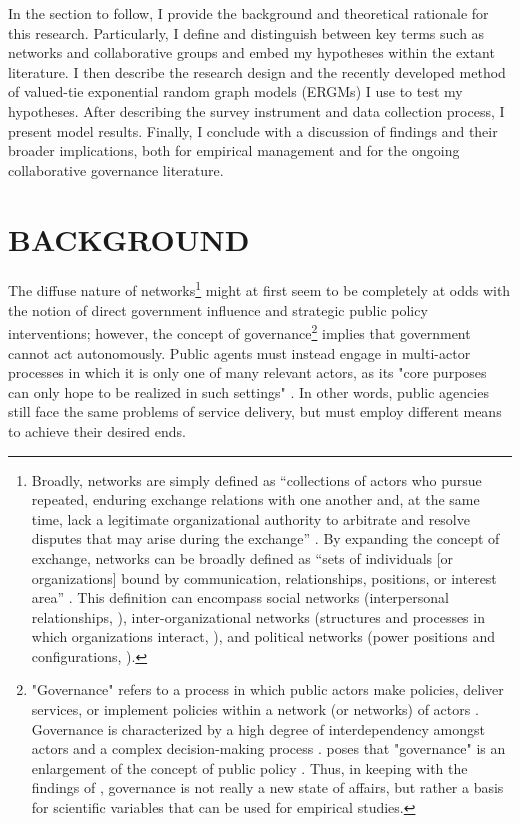 \documentclass[12pt,a4paper,titlepage]{article}
\begin{document}
In the section to follow, I provide the background and theoretical rationale for this research. Particularly, I define and distinguish between key terms such as networks and collaborative groups and embed my hypotheses within the extant literature. I then describe the research design and the recently developed method of valued-tie exponential random graph models (ERGMs) \parencite{krivitsky2012, krivitsky2013,cranmer2011,desmarais2012-a,wyatt2009,wyatt2010} I use to test my hypotheses. After describing the survey instrument and data collection process, I present model results. Finally, I conclude with a discussion of findings and their broader implications, both for empirical management and for the ongoing collaborative governance literature.

\section{\bf\MakeUppercase{Background}}

The diffuse nature of networks\footnote{Broadly, networks are simply defined as “collections of actors who pursue repeated, enduring exchange relations with one another and, at the same time, lack a legitimate organizational authority to arbitrate and resolve disputes that may arise during the exchange” \parencite[59]{podolny1998}. By expanding the concept of exchange, networks can be broadly defined as “sets of individuals [or organizations] bound by communication, relationships, positions, or interest area” \parencite[33]{margerum2011}. This definition can encompass social networks (interpersonal relationships, \cite{putnam2000}), inter-organizational networks (structures and processes in which organizations interact, \cite{alexander1993}), and political networks (power positions and configurations, \cite{knoke1990}).} might at first seem to be completely at odds with the notion of direct government influence and strategic public policy interventions; however, the concept of governance\footnote{"Governance" refers to a process in which public actors make policies, deliver services, or implement policies within a network (or networks) of actors \parencite{frederickson2005,rhodes1997,torfing2007}. Governance is characterized by a high degree of interdependency amongst actors and a complex decision-making process \parencite{klijn2010}. \textcite[125]{bressers2009} poses that "governance" is an enlargement of the concept of public policy \parencite[also][]{bressers2003}. Thus, in keeping with the findings of \textcite{ostrom1961}, governance is not really a new state of affairs, but rather a basis for scientific variables that can be used for empirical studies.} implies that government cannot act autonomously. Public agents must instead engage in multi-actor processes in which it is only one of many relevant actors, as its "core purposes can only hope to be realized in such settings" \parencite[130]{bressers2009}. In other words, public agencies still face the same problems of service delivery, but must employ different means to achieve their desired ends.
\end{document}
